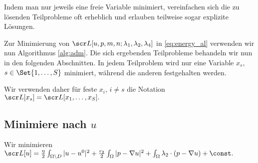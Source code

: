 \documentclass{mythesis}
\begin{document}
Indem man nur jeweils eine freie Variable minimiert, vereinfachen sich die zu lösenden Teilprobleme oft erheblich und erlauben teilweise sogar explizite Lösungen.

Zur Minimierung von $\scr L[u,p,m,n;\lambda_1,\lambda_2,\lambda_4]$ in \eqref{eq:energy_al} verwenden wir nun Algorithmus \ref{alg:adm}.
Die sich ergebenden Teilprobleme behandeln wir nun in den folgenden Abschnitten.
In jedem Teilproblem wird nur eine Variable $x_s$, $s \in \Set{1, \dotsc, S}$ minimiert, während die anderen festgehalten werden.

Wir verwenden daher für feste $x_i$, $i \neq s$ die Notation
\begin{math}
    \scr L[x_s] = \scr L[x_1, \dotsc, x_S].
\end{math}


\subsection*{Minimiere nach $u$}

Wir minimieren
\begin{math}
    \scr L[u] =
    \frac{\eta}{2} \int_{\Omega \setminus D} |u - u^0|^2
    + \frac{r_2}{2} \int_\Omega |p - \nabla u|^2
    + \int_\Omega \lambda_2 \cdot (p - \nabla u)
    + \const.
\end{math}
\end{document}

